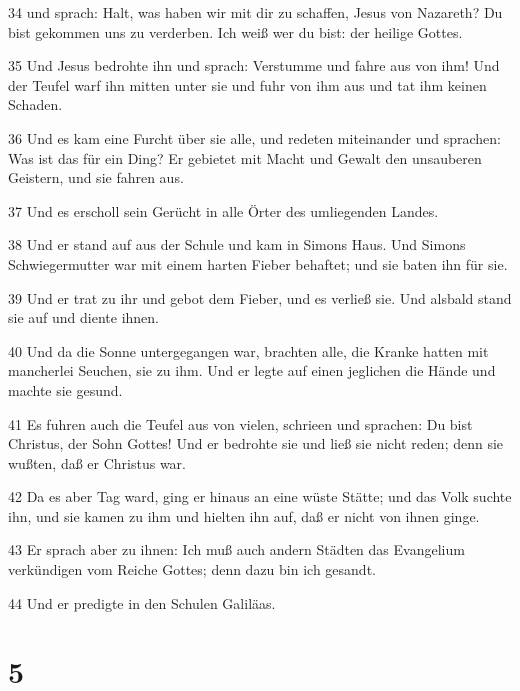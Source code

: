 \par 34 und sprach: Halt, was haben wir mit dir zu schaffen, Jesus von Nazareth? Du bist gekommen uns zu verderben. Ich weiß wer du bist: der heilige Gottes.
\par 35 Und Jesus bedrohte ihn und sprach: Verstumme und fahre aus von ihm! Und der Teufel warf ihn mitten unter sie und fuhr von ihm aus und tat ihm keinen Schaden.
\par 36 Und es kam eine Furcht über sie alle, und redeten miteinander und sprachen: Was ist das für ein Ding? Er gebietet mit Macht und Gewalt den unsauberen Geistern, und sie fahren aus.
\par 37 Und es erscholl sein Gerücht in alle Örter des umliegenden Landes.
\par 38 Und er stand auf aus der Schule und kam in Simons Haus. Und Simons Schwiegermutter war mit einem harten Fieber behaftet; und sie baten ihn für sie.
\par 39 Und er trat zu ihr und gebot dem Fieber, und es verließ sie. Und alsbald stand sie auf und diente ihnen.
\par 40 Und da die Sonne untergegangen war, brachten alle, die Kranke hatten mit mancherlei Seuchen, sie zu ihm. Und er legte auf einen jeglichen die Hände und machte sie gesund.
\par 41 Es fuhren auch die Teufel aus von vielen, schrieen und sprachen: Du bist Christus, der Sohn Gottes! Und er bedrohte sie und ließ sie nicht reden; denn sie wußten, daß er Christus war.
\par 42 Da es aber Tag ward, ging er hinaus an eine wüste Stätte; und das Volk suchte ihn, und sie kamen zu ihm und hielten ihn auf, daß er nicht von ihnen ginge.
\par 43 Er sprach aber zu ihnen: Ich muß auch andern Städten das Evangelium verkündigen vom Reiche Gottes; denn dazu bin ich gesandt.
\par 44 Und er predigte in den Schulen Galiläas.

\chapter{5}

